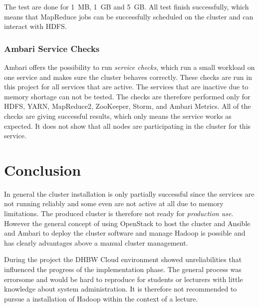 The test are done for 1~\ac{MB}, 1~\ac{GB} and 5~\ac{GB}.
All test finish successfully, which means that MapReduce jobs can be successfully scheduled on the cluster and can interact with \ac{HDFS}.

\subsubsection{Ambari Service Checks}

Ambari offers the possibility to run \emph{service checks}, which run a small workload on one service and makes sure the cluster behaves correctly.
These checks are run in this project for all services that are active.
The services that are inactive due to memory shortage can not be tested.
The checks are therefore performed  only for \ac{HDFS}, \ac{YARN}, MapReduce2, ZooKeeper, Storm, and Ambari Metrics. All of the checks are giving successful results, which only means the service works as expected. It does not show that all nodes are participating in the cluster for this service. 

\section{Conclusion}

In general the cluster installation is only partially successful since the services are not running reliably and some even are not active at all due to memory limitations.
The produced cluster is therefore not ready for \emph{production use}.
However the general concept of using OpenStack to host the cluster and Ansible and Ambari to deploy the cluster software and manage Hadoop is possible and has clearly advantages above a manual cluster management.

During the project the \ac{DHBW} Cloud environment showed unreliabilities that influenced the progress of the implementation phase.
The general process was errorsome and would be hard to reproduce for students or lecturers with little knowledge about system administration. It is therefore not recommended to pursue a installation of Hadoop within the context of a lecture. 


















